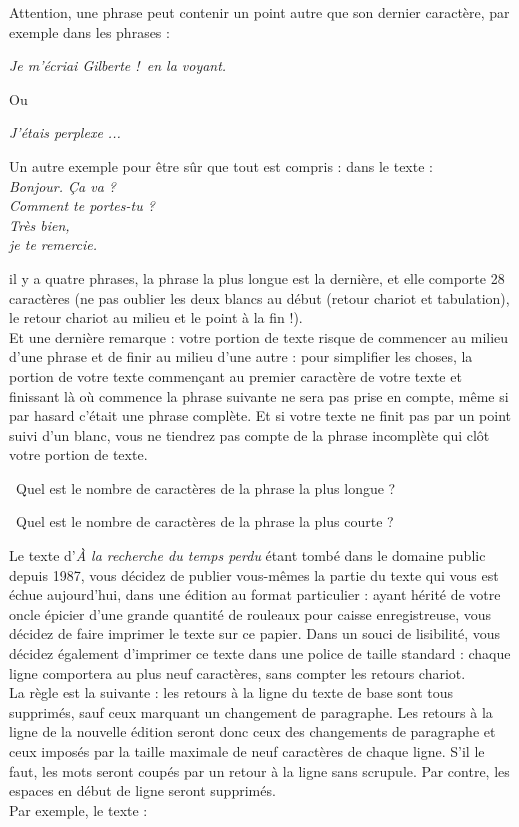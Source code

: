 Attention, une phrase peut contenir un point autre que son dernier caractère, par exemple dans les 
phrases :
\begin{center}
\emph{Je m'écriai \og Gilberte !\fg\ en la voyant.}
\end{center}

Ou
\begin{center}
\emph{J'étais perplexe ...}
\end{center}

Un autre exemple pour être sûr que tout est compris : dans le texte :\\

\emph{
Bonjour. Ça va ?\\
Comment te portes-tu ?\\
\indent Très bien,\\ je te remercie.\\}

il y a quatre phrases, la phrase la plus longue est la dernière, et elle comporte 28 caractères (ne 
pas oublier les deux blancs au début (retour chariot et tabulation), le retour chariot au milieu et le point à la fin 
!).\\

Et une dernière remarque : votre portion de texte risque de commencer au milieu d'une phrase et de finir au milieu 
d'une autre : pour simplifier les choses, la portion de votre texte commençant au premier caractère de votre texte 
et finissant là où commence la phrase suivante ne sera pas prise en compte, même si par hasard c'était une phrase 
complète. Et si votre texte ne finit pas par un point suivi d'un blanc, vous ne tiendrez pas compte de la 
phrase incomplète qui clôt votre portion de texte.


\question\ Quel est le nombre de caractères de la phrase la plus longue ?

\medskip

\question\ Quel est le nombre de caractères de la phrase la plus courte ?



\noindent Le texte d'\emph{À la recherche du temps perdu} étant tombé dans le domaine public depuis 1987, 
vous décidez de publier vous-mêmes la partie du texte qui vous est échue aujourd'hui, dans une 
édition au format particulier : ayant hérité de votre oncle épicier d'une grande quantité de 
rouleaux pour caisse enregistreuse, vous décidez de faire imprimer le texte sur ce papier. Dans un 
souci de lisibilité, vous décidez également d'imprimer ce texte dans une police de taille standard 
: chaque ligne comportera au plus neuf caractères, sans compter les retours chariot.\\
La règle est la suivante : les retours à la ligne du texte de base sont tous supprimés, sauf ceux 
marquant un changement de paragraphe. Les retours à la ligne de la nouvelle édition seront donc 
ceux des changements de paragraphe et ceux imposés par la taille maximale de neuf caractères de 
chaque ligne. S'il le faut, les mots seront coupés par un retour à la ligne sans scrupule. Par 
contre, les espaces en début de ligne seront supprimés.\\
Par exemple, le texte :\\

